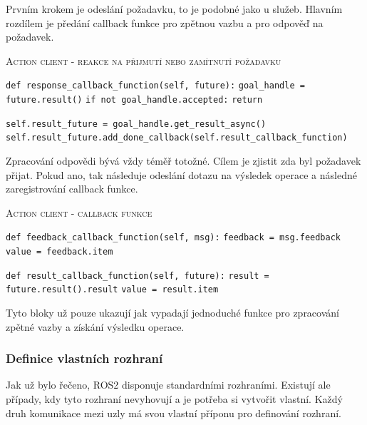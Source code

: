Prvním krokem je odeslání požadavku, to je podobné jako u služeb. Hlavním rozdílem je předání callback funkce pro zpětnou vazbu a pro odpověď na požadavek.

\begin{algorithm}[h!]
	\label{}
	\caption{\textsc{Action client - reakce na přijmutí nebo zamítnutí požadavku}}
	
	\DontPrintSemicolon
	\SetAlgoNoLine
	\SetNlSty{}{}{:}
	\SetNlSkip{-1.1em}
	
	\BlankLine \Indp\Indpp
	
	\texttt{def response\_callback\_function(self, future):}\;
	\Indp\Indp
	\texttt{goal\_handle = future.result()}\;
	\texttt{if not goal\_handle.accepted:}\;
	\Indp\Indp
	\texttt{return}\;
	\Indm\Indm
	
	\BlankLine
	\texttt{self.result\_future = goal\_handle.get\_result\_async()}\;
	\texttt{self.result\_future.add\_done\_callback(self.result\_callback\_function)}\;
	\Indm\Indm
	
\end{algorithm}
Zpracování odpovědi bývá vždy téměř totožné. Cílem je zjistit zda byl požadavek přijat. Pokud ano, tak následuje odeslání dotazu na výsledek operace a následné zaregistrování callback funkce. \cite{ros2_documentation}

\begin{algorithm}[h!]
	\label{}
	\caption{\textsc{Action client - callback funkce}}
	
	\DontPrintSemicolon
	\SetAlgoNoLine
	\SetAlgoNlRelativeSize{-1}
	\SetNlSty{}{}{:}
	\SetNlSkip{-1.1em}
	
	\BlankLine \Indp\Indpp
	
	\BlankLine
	\texttt{def feedback\_callback\_function(self, msg):}\;
	\Indp\Indp
	\texttt{feedback = msg.feedback}\;
	\texttt{value = feedback.item}\;
	\Indm\Indm
	
	\BlankLine
	\texttt{def result\_callback\_function(self, future):}\;
	\Indp\Indp
	\texttt{result = future.result().result}\;
	\texttt{value = result.item}\;

\end{algorithm}
Tyto bloky už pouze ukazují jak vypadají jednoduché funkce pro zpracování zpětné vazby a získání výsledku operace.

\subsubsection*{Definice vlastních rozhraní} \label{theory:custom_interfaces}
Jak už bylo řečeno, ROS2 disponuje standardními rozhraními. Existují ale případy, kdy tyto rozhraní nevyhovují a je potřeba si vytvořit vlastní. Každý druh komunikace mezi uzly má svou vlastní příponu pro definování rozhraní. \cite{ros2_introduction}

